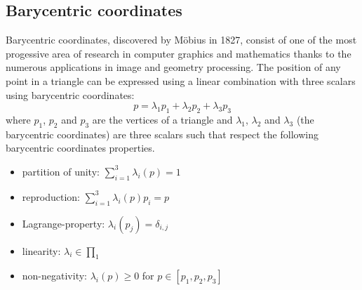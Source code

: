 \subsection{Barycentric coordinates}\label{section:barycentric-coord}
Barycentric coordinates, discovered by M\"obius in 1827, consist of one of the most progessive area of research in computer graphics and mathematics thanks to the numerous applications in image and geometry processing.
\cite{REPORT:localbarycentricoordsepfl}
The position of any point in a triangle can be expressed using a linear combination with three scalars using barycentric coordinates:
$$ p = \lambda_1 p_1 + \lambda_2 p_2 + \lambda_3 p_3$$
where $p_1$, $p_2$ and $p_3$ are the vertices of a triangle and $\lambda_1$, $\lambda_2$ and $\lambda_3$ (the barycentric coordinates) are three scalars such that
respect the following barycentric coordinates properties.\cite{SLIDE:ICORSI}
\begin{itemize}
  \item partition of unity: $\sum_{i=1}^3 \lambda_{i}(p) = 1$
  \item reproduction: $\sum_{i=1}^3 \lambda_{i}(p)p_i = p$
  \item Lagrange-property: $\lambda_i(p_j) = \delta_{i, j}$
  \item linearity: $\lambda_i \in \prod_1$
  \item non-negativity: $\lambda_i(p)\geq 0$ for $p \in [p_1, p_2, p_3]$
\end{itemize}

